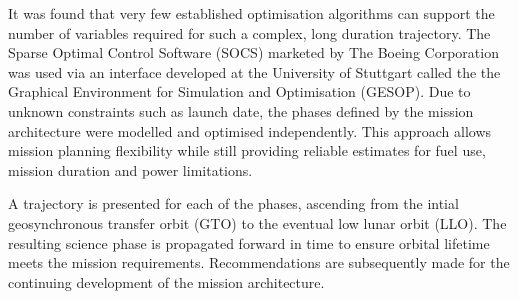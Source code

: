It was found that very few established optimisation algorithms can support the number of variables required for such a complex, long duration trajectory. The Sparse Optimal Control Software (SOCS) marketed by The Boeing Corporation was used via an interface developed at the University of Stuttgart called the the Graphical Environment for Simulation and Optimisation (GESOP). Due to unknown constraints such as launch date, the phases defined by the mission architecture were modelled and optimised independently. This approach allows mission planning flexibility while still providing reliable estimates for fuel use, mission duration and power limitations.

A trajectory is presented for each of the phases, ascending from the intial geosynchronous transfer orbit (GTO) to the eventual low lunar orbit (LLO). The resulting science phase is propagated forward in time to ensure orbital lifetime meets the mission requirements. Recommendations are subsequently made for the continuing development of the mission architecture.

\vfill